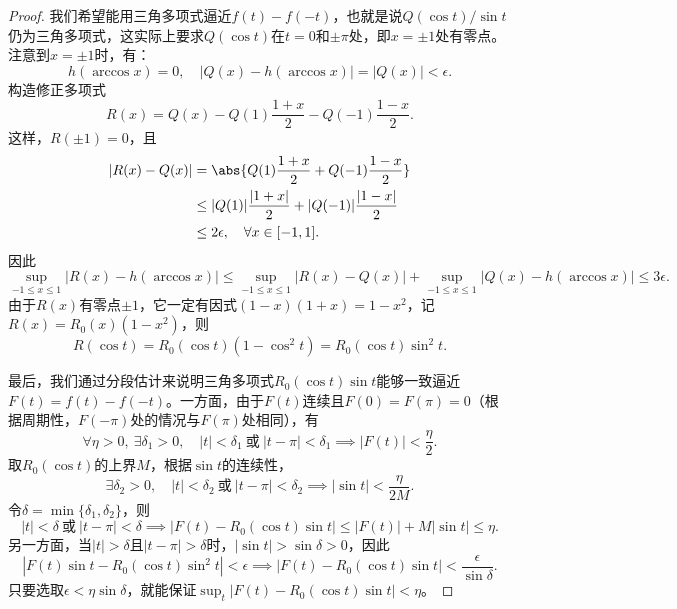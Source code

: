 \begin{proof}
    我们希望能用三角多项式逼近$f(t)-f(-t)$，也就是说$Q(\cos t)/\sin t$仍为三角多项式，这实际上要求$Q(\cos t)$在$t=0$和$\pm\pi$处，即$x=\pm 1$处有零点。注意到$x=\pm 1$时，有：
    \begin{equation}
        h(\arccos x)=0,\quad |Q(x)-h(\arccos x)|=|Q(x)|<\epsilon.
    \end{equation}
    构造修正多项式
    \begin{equation}
        R(x)=Q(x)-Q(1)\frac{1+x}{2}-Q(-1)\frac{1-x}{2}.
    \end{equation}
    这样，$R(\pm 1)=0$，且
    \begin{align}
        |R(x)-Q(x)|&=\abs{Q(1)\frac{1+x}{2}+Q(-1)\frac{1-x}{2}} \nonumber \\
        &\leq |Q(1)|\frac{|1+x|}{2}+|Q(-1)|\frac{|1-x|}{2} \nonumber \\
        &\leq 2\epsilon,\quad \forall x\in[-1,1].
    \end{align}
    因此
    \begin{equation}
        \sup_{-1\leq x\leq 1}|R(x)-h(\arccos x)|\leq\sup_{-1\leq x\leq 1}|R(x)-Q(x)|+\sup_{-1\leq x\leq 1}|Q(x)-h(\arccos x)|\leq 3\epsilon.
    \end{equation}
    由于$R(x)$有零点$\pm 1$，它一定有因式$(1-x)(1+x)=1-x^2$，记$R(x)=R_0(x)(1-x^2)$，则
    \begin{equation}
        R(\cos t)=R_0(\cos t)(1-\cos^2 t)=R_0(\cos t)\sin^2 t.
    \end{equation}

    最后，我们通过分段估计来说明三角多项式$R_0(\cos t)\sin t$能够一致逼近$F(t)=f(t)-f(-t)$。一方面，由于$F(t)$连续且$F(0)=F(\pi)=0$（根据周期性，$F(-\pi)$处的情况与$F(\pi)$处相同），有
    \begin{equation}
        \forall\eta>0,\ \exists\delta_1>0,\quad |t|<\delta_1\ \text{或}\ |t-\pi|<\delta_1\implies |F(t)|<\frac{\eta}{2}.
    \end{equation}
    取$R_0(\cos t)$的上界$M$，根据$\sin t$的连续性，
    \begin{equation}
        \exists\delta_2>0,\quad |t|<\delta_2\ \text{或}\ |t-\pi|<\delta_2\implies|\sin t|<\frac{\eta}{2M}.
    \end{equation}
    令$\delta=\min\{\delta_1,\delta_2\}$，则
    \begin{equation}
        |t|<\delta\ \text{或}\ |t-\pi|<\delta\implies |F(t)-R_0(\cos t)\sin t|\leq |F(t)|+M|\sin t|\leq\eta.
    \end{equation}
    另一方面，当$|t|>\delta$且$|t-\pi|>\delta$时，$|\sin t|>\sin\delta>0$，因此
    \begin{equation}
        |F(t)\sin t-R_0(\cos t)\sin^2 t|<\epsilon\implies|F(t)-R_0(\cos t)\sin t|<\frac{\epsilon}{\sin\delta}.
    \end{equation}
    只要选取$\epsilon<\eta\sin\delta$，就能保证$\sup_t |F(t)-R_0(\cos t)\sin t|<\eta$。
\end{proof}


